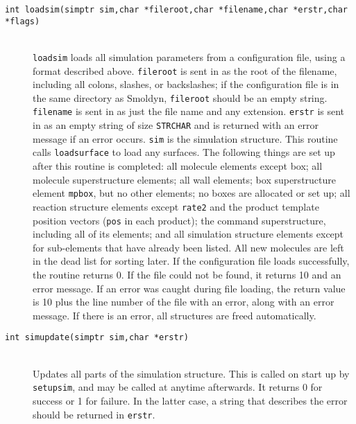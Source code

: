 \documentclass {book}
\begin{document}
\begin{description}
\item[\texttt{int loadsim(simptr sim,char *fileroot,char *filename,char *erstr,char *flags)}]
\hfill \\
\texttt{loadsim} loads all simulation parameters from a configuration file, using a format described above.  \texttt{fileroot} is sent in as the root of the filename, including all colons, slashes, or backslashes; if the configuration file is in the same directory as Smoldyn, \texttt{fileroot} should be an empty string.  \texttt{filename} is sent in as just the file name and any extension.  \texttt{erstr} is sent in as an empty string of size \texttt{STRCHAR} and is returned with an error message if an error occurs.  \texttt{sim} is the simulation structure.  This routine calls \texttt{loadsurface} to load any surfaces.  The following things are set up after this routine is completed: all molecule elements except box; all molecule superstructure elements; all wall elements; box superstructure element \texttt{mpbox}, but no other elements; no boxes are allocated or set up; all reaction structure elements except \texttt{rate2} and the product template position vectors (\texttt{pos} in each product); the command superstructure, including all of its elements; and all simulation structure elements except for sub-elements that have already been listed.  All new molecules are left in the dead list for sorting later.  If the configuration file loads successfully, the routine returns 0.  If the file could not be found, it returns 10 and an error message.  If an error was caught during file loading, the return value is 10 plus the line number of the file with an error, along with an error message.  If there is an error, all structures are freed automatically.

\item[\texttt{int simupdate(simptr sim,char *erstr)}]
\hfill \\
Updates all parts of the simulation structure.  This is called on start up by \texttt{setupsim}, and may be called at anytime afterwards.  It returns 0 for success or 1 for failure.  In the latter case, a string that describes the error should be returned in \texttt{erstr}.


\end{description}
\end{document}
